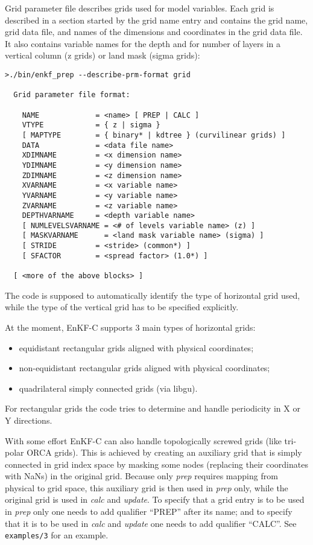 \documentclass[11pt]{report}
\begin{document}
Grid parameter file describes grids used for model variables.
Each grid is described in a section started by the grid name entry and contains the grid name, grid data file, and names of the dimensions and coordinates in the grid data file.
It also contains variable names for the depth and for number of layers in a vertical column (z grids) or land mask (sigma grids):
\begin{Verbatim}[frame=single,fontsize=\footnotesize]
>./bin/enkf_prep --describe-prm-format grid

  Grid parameter file format:

    NAME             = <name> [ PREP | CALC ]
    VTYPE            = { z | sigma }
    [ MAPTYPE        = { binary* | kdtree } (curvilinear grids) ]
    DATA             = <data file name>
    XDIMNAME         = <x dimension name>
    YDIMNAME         = <y dimension name>
    ZDIMNAME         = <z dimension name>
    XVARNAME         = <x variable name>
    YVARNAME         = <y variable name>
    ZVARNAME         = <z variable name>
    DEPTHVARNAME     = <depth variable name>
    [ NUMLEVELSVARNAME = <# of levels variable name> (z) ]
    [ MASKVARNAME      = <land mask variable name> (sigma) ]
    [ STRIDE         = <stride> (common*) ]
    [ SFACTOR        = <spread factor> (1.0*) ]

  [ <more of the above blocks> ]
\end{Verbatim}

The code is supposed to automatically identify the type of horizontal grid used, while the type of the vertical grid has to be specified explicitly.

At the moment, EnKF-C supports 3 main types of horizontal grids:
\begin{itemize}
\item equidistant rectangular grids aligned with physical coordinates;
\item non-equidistant rectangular grids aligned with physical coordinates;
\item quadrilateral simply connected grids (via libgu).
\end{itemize}
For rectangular grids the code tries to determine and handle periodicity in X or Y directions.

With some effort EnKF-C can also handle topologically screwed grids (like tri-polar ORCA grids).
This is achieved by creating an auxiliary grid that is simply connected in grid index space by masking some nodes (replacing their coordinates with NaNs) in the original grid.
Because only \emph{prep} requires mapping from physical to grid space, this auxiliary grid is then used in \emph{prep} only, while the original grid is used in \emph{calc} and \emph{update}.
To specify that a grid entry is to be used in \emph{prep} only one needs to add qualifier ``PREP'' after its name; and to specify that it is to be used in \emph{calc} and \emph{update} one needs to add qualifier ``CALC''.
See \verb|examples/3| for an example.
\end{document}
